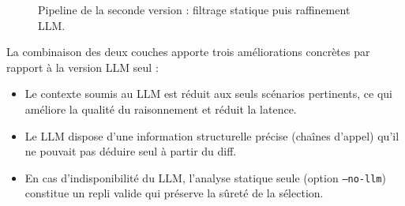 \documentclass[12pt,a4paper]{article}
\begin{document}
\begin{figure}[H]
\centering
{}
\caption{Pipeline de la seconde version : filtrage statique puis raffinement LLM.}
\label{fig:pipeline-v2}
\end{figure}

La combinaison des deux couches apporte trois améliorations concrètes
par rapport à la version LLM seul :

\begin{itemize}[noitemsep]
  \item Le contexte soumis au LLM est réduit aux seuls scénarios
        pertinents, ce qui améliore la qualité du raisonnement et
        réduit la latence.
  \item Le LLM dispose d'une information structurelle précise (chaînes
        d'appel) qu'il ne pouvait pas déduire seul à partir du diff.
  \item En cas d'indisponibilité du LLM, l'analyse statique seule
        (option \texttt{--no-llm}) constitue un repli valide qui préserve
        la sûreté de la sélection.
\end{itemize}
\end{document}
